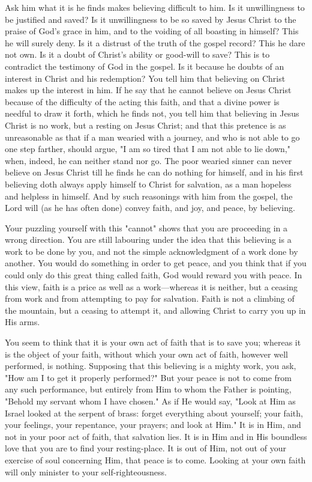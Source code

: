 \documentclass[
]{book}
\begin{document}
Ask him what it is he finds makes believing difficult to him. Is it unwillingness to be justified and saved? Is it unwillingness to be so saved by Jesus Christ to the praise of God's grace in him, and to the voiding of all boasting in himself? This he will surely deny. Is it a distrust of the truth of the gospel record? This he dare not own. Is it a doubt of Christ's ability or good-will to save? This is to contradict the testimony of God in the gospel. Is it because he doubts of an interest in Christ and his redemption? You tell him that believing on Christ makes up the interest in him. If he say that he cannot believe on Jesus Christ because of the difficulty of the acting this faith, and that a divine power is needful to draw it forth, which he finds not, you tell him that believing in Jesus Christ is no work, but a resting on Jesus Christ; and that this pretence is as unreasonable as that if a man wearied with a journey, and who is not able to go one step farther, should argue, "I am so tired that I am not able to lie down," when, indeed, he can neither stand nor go. The poor wearied sinner can never believe on Jesus Christ till he finds he can do nothing for himself, and in his first believing doth always apply himself to Christ for salvation, as a man hopeless and helpless in himself. And by such reasonings with him from the gospel, the Lord will (as he has often done) convey faith, and joy, and peace, by believing.

Your puzzling yourself with this "cannot" shows that you are proceeding in a wrong direction. You are still labouring under the idea that this believing is a work to be done by you, and not the simple acknowledgment of a work done by another. You would do something in order to get peace, and you think that if you could only do this great thing called faith, God would reward you with peace. In this view, faith is a price as well as a work---whereas it is neither, but a ceasing from work and from attempting to pay for salvation. Faith is not a climbing of the mountain, but a ceasing to attempt it, and allowing Christ to carry you up in His arms.

You seem to think that it is your own act of faith that is to save you; whereas it is the object of your faith, without which your own act of faith, however well performed, is nothing. Supposing that this believing is a mighty work, you ask, "How am I to get it properly performed?" But your peace is not to come from any such performance, but entirely from Him to whom the Father is pointing, "Behold my servant whom I have chosen." As if He would say, "Look at Him as Israel looked at the serpent of brass: forget everything about yourself; your faith, your feelings, your repentance, your prayers; and look at Him." It is in Him, and not in your poor act of faith, that salvation lies. It is in Him and in His boundless love that you are to find your resting-place. It is out of Him, not out of your exercise of soul concerning Him, that peace is to come. Looking at your own faith will only minister to your self-righteousness.
\end{document}
